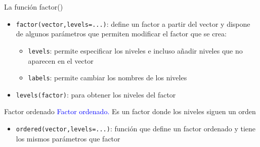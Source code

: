 \documentclass[
  ignorenonframetext,
  aspectratio=169]{beamer}
\providecommand{\tightlist}{%
  \setlength{\itemsep}{0pt}\setlength{\parskip}{0pt}}
\newcommand\blue[1]{\textcolor{blue}{#1}}
\begin{document}
\begin{frame}[fragile]{La función factor()}
\label{la-funciuxf3n-factor}
\begin{itemize}
\item
  \texttt{factor(vector,levels=...)}: define un factor a partir del
  vector y dispone de algunos parámetros que permiten modificar el
  factor que se crea:

  \begin{itemize}
  \tightlist
  \item
    \texttt{levels}: permite especificar los niveles e incluso añadir
    niveles que no aparecen en el vector
  \item
    \texttt{labels}: permite cambiar los nombres de los niveles
  \end{itemize}
\item
  \texttt{levels(factor)}: para obtener los niveles del factor
\end{itemize}
\end{frame}

\begin{frame}[fragile]{Factor ordenado}
\label{factor-ordenado}
\blue{Factor ordenado.} Es un factor donde los niveles siguen un orden

\begin{itemize}
\tightlist
\item
  \texttt{ordered(vector,levels=...)}: función que define un factor
  ordenado y tiene los mismos parámetros que factor
\end{itemize}
\end{frame}
\end{document}
